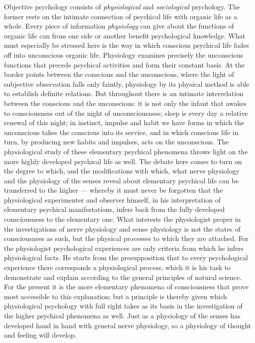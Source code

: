 \documentclass[12pt,a4paper]{book}
\newcommand{\opage}[1]{\marginnote{\footnotesize\textit{[#1]}}}
\begin{document}
Objective psychology consists of \emph{physiological} and
\emph{sociological} psychology. The former rests on the intimate
connection of psychical life with organic life as a whole. Every piece of
information \emph{physiology} can give about the functions of organic
life can from one side or another benefit psychological knowledge. What
must especially be stressed here is the way in which conscious psychical
life fades off into unconscious organic life. Physiology examines
precisely the unconscious functions that precede psychical activities and
form their constant basis. At the border points between the conscious
and the unconscious, where the light of subjective observation falls only
faintly, physiology by its physical method is able to establish definite
relations. But throughout there is an intimate interrelation between the
conscious and the unconscious: it is not only the infant that awakes to
consciousness out of the night of unconsciousness; sleep is every day a
relative renewal of this night; in instinct, impulse and habit we have
forms in which the unconscious takes the conscious into its service, and
in which conscious life in turn, by producing new habits and impulses,
acts on the unconscious. The physiological study of these elementary
psychical phenomena throws light on the more highly developed psychical
life as well. The debate here comes to turn on the degree to which, and
the modifications with which, what nerve physiology and the physiology
of the senses reveal about elementary psychical life can be transferred
to the higher --- whereby it must never be forgotten that the
physiological experimenter and observer himself, in his interpretation of
elementary psychical manifestations, infers back from the fully developed
consciousness to the elementary one. What interests the physiologist
proper in the investigations of nerve physiology and sense physiology is
not the states of consciousness as such, but the physical processes to
which they are attached. For the physiologist psychological experiences
are only criteria from which he infers physiological facts. He starts
from the presupposition that to every psychological experience there
corresponds a physiological process, which it is his task
\opage{31}to demonstrate and explain according to the general principles
of natural science. For the present it is the more elementary phenomena
of consciousness that prove most accessible to this explanation; but a
principle is thereby given which physiological psychology with full right
takes as its basis in the investigation of the higher psychical phenomena
as well. Just as a physiology of the senses has developed hand in hand
with general nerve physiology, so a physiology of thought and feeling
will develop.
\end{document}
